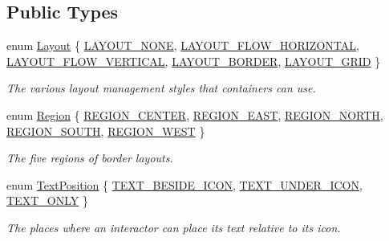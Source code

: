 \subsection*{Public Types}
\begin{DoxyCompactItemize}
\item 
enum \mbox{\hyperlink{classGContainer_a1b7da28ed84c0763e8f92cde2df4799b}{Layout}} \{ \mbox{\hyperlink{classGContainer_a1b7da28ed84c0763e8f92cde2df4799bac7afd1f77438e15d91d69c735a3a909a}{L\+A\+Y\+O\+U\+T\+\_\+\+N\+O\+NE}}, 
\mbox{\hyperlink{classGContainer_a1b7da28ed84c0763e8f92cde2df4799bac89a811e02b929a18f7f34e7d3bebd63}{L\+A\+Y\+O\+U\+T\+\_\+\+F\+L\+O\+W\+\_\+\+H\+O\+R\+I\+Z\+O\+N\+T\+AL}}, 
\mbox{\hyperlink{classGContainer_a1b7da28ed84c0763e8f92cde2df4799ba31e93ff7f38812816b05d254e04228e3}{L\+A\+Y\+O\+U\+T\+\_\+\+F\+L\+O\+W\+\_\+\+V\+E\+R\+T\+I\+C\+AL}}, 
\mbox{\hyperlink{classGContainer_a1b7da28ed84c0763e8f92cde2df4799babce8e871f79a8c9085d90c968d8827de}{L\+A\+Y\+O\+U\+T\+\_\+\+B\+O\+R\+D\+ER}}, 
\mbox{\hyperlink{classGContainer_a1b7da28ed84c0763e8f92cde2df4799bac4b094ed4f8bf75f60ba2235771371c3}{L\+A\+Y\+O\+U\+T\+\_\+\+G\+R\+ID}}
 \}
\begin{DoxyCompactList}\small\item\em The various layout management styles that containers can use. \end{DoxyCompactList}\item 
enum \mbox{\hyperlink{classGContainer_a81a01a86de31071a92e6cce0bab9bc4b}{Region}} \{ \mbox{\hyperlink{classGContainer_a81a01a86de31071a92e6cce0bab9bc4ba5ba85a564dbf472d69f92d5a2870db16}{R\+E\+G\+I\+O\+N\+\_\+\+C\+E\+N\+T\+ER}}, 
\mbox{\hyperlink{classGContainer_a81a01a86de31071a92e6cce0bab9bc4baac78951bd4e01d20f4825d5ae0a54357}{R\+E\+G\+I\+O\+N\+\_\+\+E\+A\+ST}}, 
\mbox{\hyperlink{classGContainer_a81a01a86de31071a92e6cce0bab9bc4baf40d135fb811ad59acb102f1fb357550}{R\+E\+G\+I\+O\+N\+\_\+\+N\+O\+R\+TH}}, 
\mbox{\hyperlink{classGContainer_a81a01a86de31071a92e6cce0bab9bc4bab533512ba438173a4ceb9c501eb17628}{R\+E\+G\+I\+O\+N\+\_\+\+S\+O\+U\+TH}}, 
\mbox{\hyperlink{classGContainer_a81a01a86de31071a92e6cce0bab9bc4ba5dd8c2219af001263c00de02b642786d}{R\+E\+G\+I\+O\+N\+\_\+\+W\+E\+ST}}
 \}
\begin{DoxyCompactList}\small\item\em The five regions of border layouts. \end{DoxyCompactList}\item 
enum \mbox{\hyperlink{classGInteractor_a8e0d441725a81d2bbdebbea09078260e}{Text\+Position}} \{ \mbox{\hyperlink{classGInteractor_a8e0d441725a81d2bbdebbea09078260ea4cd6f2e7d5a08d6f4dc052df2358f774}{T\+E\+X\+T\+\_\+\+B\+E\+S\+I\+D\+E\+\_\+\+I\+C\+ON}}, 
\mbox{\hyperlink{classGInteractor_a8e0d441725a81d2bbdebbea09078260eaa88490f63d8de68d44c83bdb2ecde3b3}{T\+E\+X\+T\+\_\+\+U\+N\+D\+E\+R\+\_\+\+I\+C\+ON}}, 
\mbox{\hyperlink{classGInteractor_a8e0d441725a81d2bbdebbea09078260ea39a6f388a30ac4fefb6eb13e846bc9f2}{T\+E\+X\+T\+\_\+\+O\+N\+LY}}
 \}
\begin{DoxyCompactList}\small\item\em The places where an interactor can place its text relative to its icon. \end{DoxyCompactList}\end{DoxyCompactItemize}
